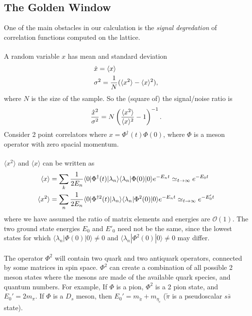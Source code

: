 \subsection{The Golden Window}

{}


One of the main obstacles in our calculation is the \textit{signal degredation} of correlation functions computed on the lattice.
\\ \\
A random variable $x$ has mean and standard deviation
\begin{align}
	&\hat{x} = \langle x \rangle \\
	&\sigma^2 = {1\over N} ( \langle x^2 \rangle - \langle x \rangle^2 ),
\end{align}
where $N$ is the size of the sample. So the (square of) the signal/noise ratio is
\begin{align}
	{\hat{x}^2\over \sigma^2} = N \left( {\langle x^2 \rangle \over \langle x \rangle^2} - 1 \right) ^{-1}.
\end{align}
Consider 2 point correlators where $x = \Phi^{\dagger}(t) \Phi(0)$, where $\Phi$ is a meson operator with zero spacial momentum.
\\ \\
$\langle x^2 \rangle$ and $\langle x \rangle$ can be written as
\begin{align}
	\langle x \rangle &= \sum_k {1\over 2E_n} \langle 0 | \Phi^{\dagger}(t) | \lambda_n \rangle \langle \lambda_n | \Phi(0) | 0 \rangle e^{-E_n t} \simeq_{t\to\infty} e^{-E_0 t}\\
	\langle x^2 \rangle &= \sum_n {1\over 2E_n} \langle 0 | \Phi^{\dagger 2}(t) | \lambda_n \rangle \langle \lambda_n | \Phi^2(0) | 0 \rangle e^{-E_n t} \simeq_{t\to\infty} e^{-E'_0 t}
\end{align}
where we have assumed the ratio of matrix elements and energies are $\mathcal{O}(1)$. The two ground state energies $E_0$ and $E'_0$ need not be the same, since the lowest states for which 
$\langle \lambda_n | \Phi(0) | 0 \rangle \neq 0$ and $\langle \lambda_n | \Phi^2(0) | 0 \rangle \neq 0$ may differ. 
\\ \\
The operator $\Phi^2$ will contain two quark and two antiquark operators, connected by some matrices in spin space. $\Phi^2$ can create a combination of all possible 2 meson states where the mesons are made of the available quark species, and quantum numbers. For example, If $\Phi$ is a pion, $\Phi^2$ is a 2 pion state, and $E_0' = 2m_{\pi}$. If $\Phi$ is a $D_s$ meson, then $E_0' = m_{\tilde{\pi}} + m_{\eta_c}$ ($\tilde{\pi}$ is a pseudoscalar $s\bar{s}$ state).
